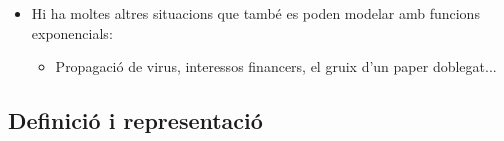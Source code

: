 \documentclass[aspectratio=169]{beamer}
\begin{document}
\begin{frame}[t]
  \vspace{-0.06cm}
  \raggedright
  \begin{itemize}
    \setlength{\topsep}{0.08em}
    \item<9-> Hi ha moltes altres situacions que també es poden modelar amb funcions exponencials:
    \begin{itemize}
      \item<10-> Propagació de virus, interessos financers, el gruix d'un paper doblegat...
    \end{itemize}
  \end{itemize}
\end{frame}

\subsection{Definició i representació}
\end{document}
